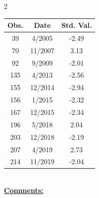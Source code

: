 
\bigskip 
\begin{multicols}{2}{ 
\begin{tabular}{ccc}
\hline  Obs.  &  Date &  Std. Val. \\ 
\hline 
                       39 &        4/2005 &         -2.49 \vspace{-.12in} \\  
                       70 &       11/2007 &          3.13 \vspace{-.12in} \\  
                       92 &        9/2009 &         -2.01 \vspace{-.12in} \\  
                      135 &        4/2013 &         -2.56 \vspace{-.12in} \\  
                      155 &       12/2014 &         -2.94 \vspace{-.12in} \\  
                      156 &        1/2015 &         -2.32 \vspace{-.12in} \\  
                      167 &       12/2015 &         -2.34 \vspace{-.12in} \\  
                      196 &        5/2018 &          2.04 \vspace{-.12in} \\  
                      203 &       12/2018 &         -2.19 \vspace{-.12in} \\  
                      207 &        4/2019 &          2.73 \vspace{-.12in} \\  
                      214 &       11/2019 &         -2.04 \vspace{-.12in} \\  
 \end{tabular} 
\\ 
 \columnbreak 
 \singlespacing 
 \underline{\textbf{Comments:}} \\ 
 \bigskip       

 } 
\end{multicols} 
